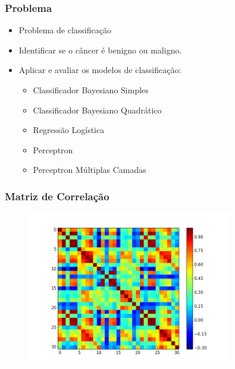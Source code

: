 \documentclass{beamer}
\begin{document}
\begin{frame}
\frametitle{Problema}
\begin{itemize}
\item Problema de classificação
\item Identificar se o câncer é benigno ou maligno.
\item Aplicar e avaliar os modelos de classificação:
\begin{itemize}
\item Classificador Bayesiano Simples
\item Classificador Bayesiano Quadrático
\item Regressão Logística
\item Perceptron
\item Perceptron Múltiplas Camadas
\end{itemize}
\end{itemize}
\end{frame}



\begin{frame}
\frametitle{Matriz de Correlação}
\begin{figure}[H]
    \centering
    \includegraphics[width=0.8\textwidth]{../img/corrcoef.png}
    \label{fig:corrcoef}
\end{figure}
\end{frame}

\end{document}
